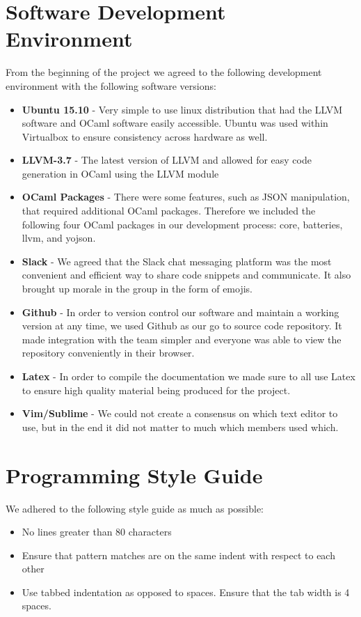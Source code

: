\begin{homeworkProblem}
	\section{Software Development Environment}
	From the beginning of the project we agreed to the following development environment with the following software versions:
	\begin{itemize}
		\item \textbf{Ubuntu 15.10} - Very simple to use linux distribution that had the LLVM software and OCaml software easily accessible. Ubuntu was used within Virtualbox to ensure consistency across hardware as well. 
		\item \textbf{LLVM-3.7} - The latest version of LLVM and allowed for easy code generation in OCaml using the LLVM module
		\item \textbf{OCaml Packages} - There were some features, such as JSON manipulation, that required additional OCaml packages. Therefore we included the following four OCaml packages in our development process: core, batteries, llvm, and yojson. 
		\item \textbf{Slack} - We agreed that the Slack chat messaging platform was the most convenient and efficient way to share code snippets and communicate. It also brought up morale in the group in the form of emojis.
		\item \textbf{Github} - In order to version control our software and maintain a working version at any time, we used Github as our go to source code repository. It made integration with the team simpler and everyone was able to view the repository conveniently in their browser. 
		\item \textbf{Latex} - In order to compile the documentation we made sure to all use Latex to ensure high quality material being produced for the project. 
		\item \textbf{Vim/Sublime} - We could not create a consensus on which text editor to use, but in the end it did not matter to much which members used which. 
	\end{itemize}
	
	\section{Programming Style Guide}
	We adhered to the following style guide as much as possible:
	\begin{itemize}
		\item No lines greater than 80 characters
		\item Ensure that pattern matches are on the same indent with respect to each other
		\item Use tabbed indentation as opposed to spaces. Ensure that the tab width is 4 spaces. 
	\end{itemize}
\end{homeworkProblem}